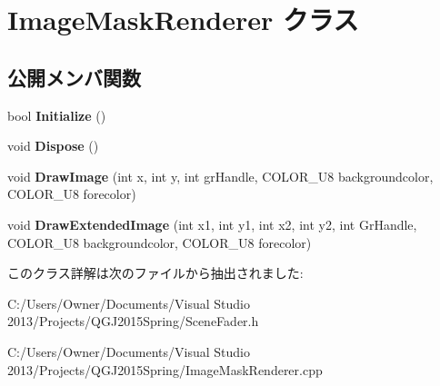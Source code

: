 \hypertarget{class_image_mask_renderer}{}\section{Image\+Mask\+Renderer クラス}
\label{class_image_mask_renderer}
\subsection*{公開メンバ関数}
\begin{DoxyCompactItemize}
\item 
bool {\bfseries Initialize} ()\hypertarget{class_image_mask_renderer_ae93fd3468f4915cbfda5503322efe837}{}\label{class_image_mask_renderer_ae93fd3468f4915cbfda5503322efe837}

\item 
void {\bfseries Dispose} ()\hypertarget{class_image_mask_renderer_a2fac8c1bbe70943132344ad6461bbf23}{}\label{class_image_mask_renderer_a2fac8c1bbe70943132344ad6461bbf23}

\item 
void {\bfseries Draw\+Image} (int x, int y, int gr\+Handle, C\+O\+L\+O\+R\+\_\+\+U8 backgroundcolor, C\+O\+L\+O\+R\+\_\+\+U8 forecolor)\hypertarget{class_image_mask_renderer_a7debc8c12a3d30879c261595032f590f}{}\label{class_image_mask_renderer_a7debc8c12a3d30879c261595032f590f}

\item 
void {\bfseries Draw\+Extended\+Image} (int x1, int y1, int x2, int y2, int Gr\+Handle, C\+O\+L\+O\+R\+\_\+\+U8 backgroundcolor, C\+O\+L\+O\+R\+\_\+\+U8 forecolor)\hypertarget{class_image_mask_renderer_a4e46e82e846b6cd111beaa5b5fcb5283}{}\label{class_image_mask_renderer_a4e46e82e846b6cd111beaa5b5fcb5283}

\end{DoxyCompactItemize}


このクラス詳解は次のファイルから抽出されました\+:\begin{DoxyCompactItemize}
\item 
C\+:/\+Users/\+Owner/\+Documents/\+Visual Studio 2013/\+Projects/\+Q\+G\+J2015\+Spring/Scene\+Fader.\+h\item 
C\+:/\+Users/\+Owner/\+Documents/\+Visual Studio 2013/\+Projects/\+Q\+G\+J2015\+Spring/Image\+Mask\+Renderer.\+cpp\end{DoxyCompactItemize}
